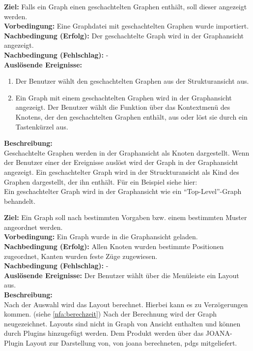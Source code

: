 \label{fa:hierarchgraph}
\textbf{Ziel:} Falls ein Graph einen geschachtelten Graphen enthält, soll dieser angezeigt werden.\\
\textbf{Vorbedingung:} Eine Graphdatei mit geschachtelten Graphen wurde importiert.\\
\textbf{Nachbedingung (Erfolg):} Der geschachtelte Graph wird in der Graphansicht angezeigt.\\
\textbf{Nachbedingung (Fehlschlag):} -\\
\textbf{Auslösende Ereignisse:}
\begin{enumerate}[nolistsep, label=(\alph*)]
  \item Der Benutzer wählt den geschachtelten Graphen aus der Strukturansicht aus.
  \item Ein Graph mit einem geschachtelten Graphen wird in der Graphansicht angezeigt.
  Der Benutzer wählt die Funktion über das Kontextmenü des Knotens, der den geschachtelten Graphen enthält, aus oder löst sie durch ein Tastenkürzel aus.
\end{enumerate}
\textbf{Beschreibung:}\\
Geschachtelte Graphen werden in der Graphansicht als Knoten dargestellt.
Wenn der Benutzer einer der Ereignisse auslöst wird der Graph in der Graphansicht angezeigt.
Ein geschachtelter Graph wird in der Struckturansicht als Kind des Graphen dargestellt, der ihn enthält. Für ein Beispiel siehe hier:\\ %
Ein geschachtelter Graph wird in der Graphansicht wie ein ``Top-Level''-Graph behandelt.


\label{fa:layout}
\textbf{Ziel:} Ein Graph soll nach bestimmten Vorgaben bzw. einem bestimmten Muster angeordnet werden.\\
\textbf{Vorbedingung:} Ein Graph wurde in die Graphansicht geladen.\\
\textbf{Nachbedingung (Erfolg):} Allen Knoten wurden bestimmte Positionen zugeordnet, Kanten wurden feste Züge zugewiesen.\\
\textbf{Nachbedingung (Fehlschlag):} -\\
\textbf{Auslösende Ereignisse:}
Der Benutzer wählt über die Menüleiste ein Layout aus.\\
\textbf{Beschreibung:}\\
Nach der Auswahl wird das Layout berechnet. Hierbei kann es zu Verzögerungen kommen. (siehe \ref{nfa:berechzeit})
Nach der Berechnung wird der Graph neugezeichnet. Layouts sind nicht in Graph von Ansicht enthalten und können durch Plugins hinzugefügt werden.
Dem Produkt werden über das JOANA-Plugin Layout zur Darstellung von, von \gls{joana} berechneten, \gls{pdg}s mitgeliefert.

